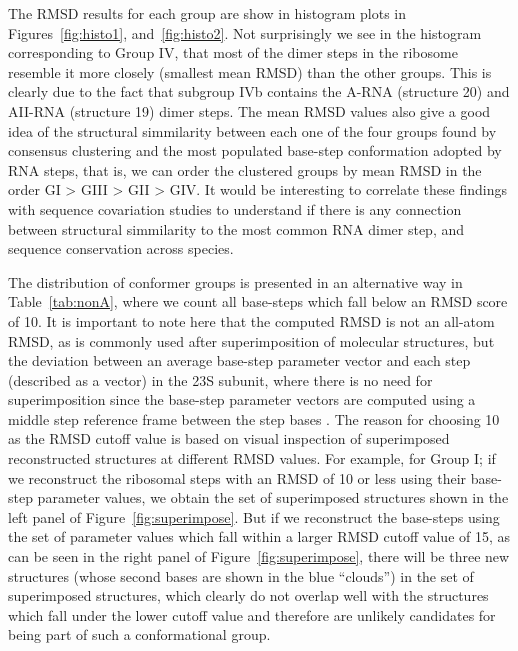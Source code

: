 The  RMSD  results for  each  group are  show  in  histogram plots  in
Figures~\ref{fig:histo1},  and~\ref{fig:histo2}.  Not  surprisingly we
see in the histogram corresponding to Group IV, that most of the dimer
steps in  the ribosome resemble  it more closely (smallest  mean RMSD)
than the other  groups. This is clearly due to  the fact that subgroup
IVb contains the A-RNA (structure 20) and AII-RNA (structure 19) dimer
steps.  The mean  RMSD values also give a good  idea of the structural
simmilarity between  each one  of the four  groups found  by consensus
clustering and  the most  populated base-step conformation  adopted by
RNA steps, that is, we can  order the clustered groups by mean RMSD in
the order GI > GIII > GII  > GIV. It would be interesting to correlate
these  findings with  sequence  covariation studies  to understand  if
there  is any connection  between structural  simmilarity to  the most
common RNA dimer step, and sequence conservation across species.

The distribution  of conformer groups  is presented in  an alternative
way in Table~\ref{tab:nonA}, where  we count all base-steps which fall
below an  RMSD score  of 10.  It  is important  to note here  that the
computed  RMSD is  not an  all-atom RMSD,  as is  commonly  used after
superimposition of molecular structures,  but the deviation between an
average  base-step parameter  vector  and each  step  (described as  a
vector) in the 23S subunit, where there is no need for superimposition
since the base-step parameter vectors are computed using a middle step
reference frame between the  step bases \cite{lu2003}.  The reason for
choosing 10 as the RMSD cutoff  value is based on visual inspection of
superimposed  reconstructed structures at  different RMSD  values. For
example, for  Group I; if we  reconstruct the ribosomal  steps with an
RMSD of 10  or less using their base-step  parameter values, we obtain
the  set  of  superimposed  structures  shown in  the  left  panel  of
Figure~\ref{fig:superimpose}.   But if  we reconstruct  the base-steps
using  the set of  parameter values  which fall  within a  larger RMSD
cutoff  value  of   15,  as  can  be  seen  in   the  right  panel  of
Figure~\ref{fig:superimpose},  there  will  be  three  new  structures
(whose second bases are shown in the blue ``clouds'') in the set of
superimposed structures,  which clearly do  not overlap well  with the
structures which fall  under the lower cutoff value  and therefore are
unlikely candidates for being part of such a conformational group.
  
